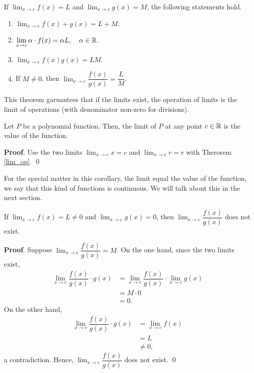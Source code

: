 \documentclass[11pt]{book}
\begin{document}
\begin{theorem}\label{lim_op}
    If $\displaystyle\lim_{x\to c}f(x)=L$ and $\displaystyle\lim_{x\to c}g(x)=M$, the following statements hold.
    \begin{enumerate}
        \item $\displaystyle\lim_{x\to c}f(x)+g(x)=L+M$.
        \item $\displaystyle\lim_{x\to c}\alpha\cdot f(x)=\alpha L,\quad \alpha\in\mathbb{R}$.
        \item $\displaystyle\lim_{x\to c}f(x)g(x)=LM$.
        \item If $M\ne0$, then $\displaystyle\lim_{x\to c}\dfrac{f(x)}{g(x)}=\dfrac{L}{M}$.
    \end{enumerate}
\end{theorem}

This theorem garuantees that if the limits exist, the operation of limits is the limit of operations (with denominator non-zero for divisions).

\begin{corollary}
    Let $P$ be a polynomial function. Then, the limit of $P$ at any point $c\in\mathbb{R}$ is the value of the function.
\end{corollary}
\textbf{Proof}. Use the two limits $\displaystyle\lim_{x\to c}x=c$ and $\displaystyle\lim_{x\to c}r=r$ with Therorem \ref{lim_op}. \qed

For the special matter in this corollary, the limit equal the value of the function, we say that this kind of functions is continuous. We will talk about this in the next section.

\begin{theorem}
    If $\displaystyle\lim_{x\to c}f(x)=L\ne 0$ and $\displaystyle\lim_{x\to c}g(x)=0$, then $\displaystyle\lim_{x\to c}\dfrac{f(x)}{g(x)}$ does not exist.
\end{theorem}
\textbf{Proof}. Suppose $\displaystyle\lim_{x\to c}\dfrac{f(x)}{g(x)}=M$. On the one hand, since the two limits exist, \begin{align*}
    \lim_{x\to c}\dfrac{f(x)}{g(x)}\cdot g(x)&=\lim_{x\to c}\dfrac{f(x)}{g(x)}\cdot\lim_{x\to c}g(x)\\
    &=M\cdot 0\\
    &=0.
\end{align*} On the other hand, \begin{align*}
    \lim_{x\to c}\dfrac{f(x)}{g(x)}\cdot g(x)&=\lim_{x\to c}f(x)\\
    &=L\\
    &\ne0,
\end{align*} a contradiction. Hence, $\displaystyle\lim_{x\to c}\dfrac{f(x)}{g(x)}$ does not exist. \qed
\end{document}
